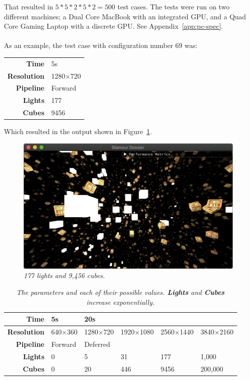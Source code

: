 \documentclass[11pt]{article}
\begin{document}
That resulted in \(5 * 5 * 2 * 5 * 2 = 500\) test cases.
The tests were run on two different machines; a Dual Core MacBook with an integrated GPU, and a Quad Core Gaming Laptop with a discrete GPU. See Appendix~\ref{app:pc-spec}.
\\
\\
As an example, the test case with configuration number 69 was:
\begin{center}
  \begin{tabular}{r|l}
    \textbf{Time}       & 5s       \\
    \textbf{Resolution} & 1280×720 \\
    \textbf{Pipeline}   & Forward  \\
    \textbf{Lights}     & 177      \\
    \textbf{Cubes}      & 9456
  \end{tabular}
\end{center}
Which resulted in the output shown in Figure~\ref{fig:test-69}.

\begin{figure}[h!]
  \begin{center}
    \includegraphics[width=0.6\columnwidth]{../test-69.png}
  \end{center}
  \caption[Test 69]{
    \emph{
      177 lights and 9,456 cubes.
    }
  }\label{fig:test-69}
\end{figure}

\begin{table}
  \caption[Parameter Table]{
    \emph{
      The parameters and each of their possible values.
      \textbf{Lights} and \textbf{Cubes} increase exponentially.
    }
  }\label{tab:parameters}
  \begin{center}
    \begin{tabular}{rlllll}
      \textbf{Time}       & 5s      & 20s      &           &           &           \\ \hline
      \textbf{Resolution} & 640×360 & 1280×720 & 1920×1080 & 2560×1440 & 3840×2160 \\ \hline
      \textbf{Pipeline}   & Forward & Deferred &           &           &           \\ \hline
      \textbf{Lights}     & 0       & 5        & 31        & 177       & 1,000     \\ \hline
      \textbf{Cubes}      & 0       & 20       & 446       & 9456      & 200,000
    \end{tabular}
  \end{center}
\end{table}
\end{document}
